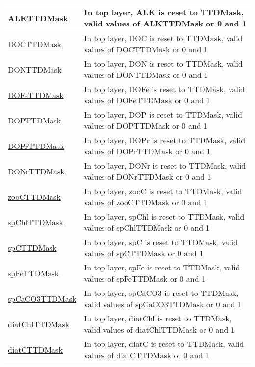 {\begin{center}
\begin{longtable}{| p{2.0in} | p{4.0in} |}
    \hline
    \hyperref[subsec:var_sec_forcing_ALKTTDMask]{ALKTTDMask} & In top layer, ALK is reset to TTDMask, valid values of ALKTTDMask or 0 and 1 \\
    \hline
    \hyperref[subsec:var_sec_forcing_DOCTTDMask]{DOCTTDMask} & In top layer, DOC is reset to TTDMask, valid values of DOCTTDMask or 0 and 1 \\
    \hline
    \hyperref[subsec:var_sec_forcing_DONTTDMask]{DONTTDMask} & In top layer, DON is reset to TTDMask, valid values of DONTTDMask or 0 and 1 \\
    \hline
    \hyperref[subsec:var_sec_forcing_DOFeTTDMask]{DOFeTTDMask} & In top layer, DOFe is reset to TTDMask, valid values of DOFeTTDMask or 0 and 1 \\
    \hline
    \hyperref[subsec:var_sec_forcing_DOPTTDMask]{DOPTTDMask} & In top layer, DOP is reset to TTDMask, valid values of DOPTTDMask or 0 and 1 \\
    \hline
    \hyperref[subsec:var_sec_forcing_DOPrTTDMask]{DOPrTTDMask} & In top layer, DOPr is reset to TTDMask, valid values of DOPrTTDMask or 0 and 1 \\
    \hline
    \hyperref[subsec:var_sec_forcing_DONrTTDMask]{DONrTTDMask} & In top layer, DONr is reset to TTDMask, valid values of DONrTTDMask or 0 and 1 \\
    \hline
    \hyperref[subsec:var_sec_forcing_zooCTTDMask]{zooCTTDMask} & In top layer, zooC is reset to TTDMask, valid values of zooCTTDMask or 0 and 1 \\
    \hline
    \hyperref[subsec:var_sec_forcing_spChlTTDMask]{spChlTTDMask} & In top layer, spChl is reset to TTDMask, valid values of spChlTTDMask or 0 and 1 \\
    \hline
    \hyperref[subsec:var_sec_forcing_spCTTDMask]{spCTTDMask} & In top layer, spC is reset to TTDMask, valid values of spCTTDMask or 0 and 1 \\
    \hline
    \hyperref[subsec:var_sec_forcing_spFeTTDMask]{spFeTTDMask} & In top layer, spFe is reset to TTDMask, valid values of spFeTTDMask or 0 and 1 \\
    \hline
    \hyperref[subsec:var_sec_forcing_spCaCO3TTDMask]{spCaCO3TTDMask} & In top layer, spCaCO3 is reset to TTDMask, valid values of spCaCO3TTDMask or 0 and 1 \\
    \hline
    \hyperref[subsec:var_sec_forcing_diatChlTTDMask]{diatChlTTDMask} & In top layer, diatChl is reset to TTDMask, valid values of diatChlTTDMask or 0 and 1 \\
    \hline
    \hyperref[subsec:var_sec_forcing_diatCTTDMask]{diatCTTDMask} & In top layer, diatC is reset to TTDMask, valid values of diatCTTDMask or 0 and 1 \\

\end{longtable}
\end{center}}
